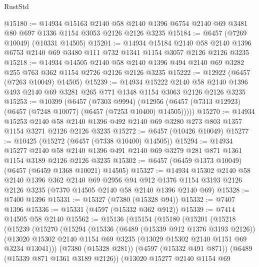 \begin{lexlean}{RustStd}
\begin{coremodule}
@15180 := @14934
    @15163
    @2140
    @58
    @2140
    @1396
    @6754
    @2140
    @69
    @3481
    @80
    @697
    @1336
    @1154
    @3053
    @2126
    @2126
    @3235
@15184 := @6457 (@7269 @10049) (@10331 @14505)
@15201 := @14934
    @15184
    @2140
    @58
    @2140
    @1396
    @6753
    @2140
    @69
    @3480
    @111
    @732
    @1341
    @1154
    @3057
    @2126
    @2126
    @3235
@15218 := @14934
    @14505
    @2140
    @58
    @2140
    @1396
    @494
    @2140
    @69
    @3282
    @255
    @763
    @362
    @1154
    @2726
    @2126
    @2126
    @3235
@15222 := @12922 (@6457 (@7263 @10049) @14505)
@15239 := @14934
    @15222
    @2140
    @58
    @2140
    @1396
    @493
    @2140
    @69
    @3281
    @265
    @771
    @1348
    @1154
    @3063
    @2126
    @2126
    @3235
@15253 := @10399
    (@6457
      (@7303 @9994)
      (@12956 (@6457 (@7313 @12923) (@6457 (@7248 @10077) (@6457 (@7253 @10400) @14505)))))
@15270 := @14934
    @15253
    @2140
    @58
    @2140
    @1396
    @492
    @2140
    @69
    @3280
    @273
    @803
    @1357
    @1154
    @3271
    @2126
    @2126
    @3235
@15272 := @6457 (@10426 @10049)
@15277 := @10425 (@15272 (@6457 (@7338 @10400) @14505))
@15294 := @14934
    @15277
    @2140
    @58
    @2140
    @1396
    @491
    @2140
    @69
    @3279
    @281
    @871
    @1361
    @1154
    @3189
    @2126
    @2126
    @3235
@15302 := @6457 (@6459 @1373 @10049) (@6457 (@6459 @1368 @10021) @14505)
@15327 := @14934
    @15302
    @2140
    @58
    @2140
    @1396
    @362
    @2140
    @69
    @2956
    @94
    @912
    @1376
    @1154
    @3193
    @2126
    @2126
    @3235
    (@7370 @14505 @2140 @58 @2140 @1396 @2140 @69)
@15328 := @7400 @1396
@15331 := @15327 (@7380 (@15328 @94))
@15332 := @7407 @1396
@15336 := @15331 (@4597 (@15332 @362 @912))
@15339 := @7414 @14505 @58 @2140
@15562 := @15136
    (@15154
      (@15180
        (@15201
          (@15218
            (@15239
              (@15270
                (@15294
                  (@15336
                    (@6489 (@15339 @912 @1376 @3193 @2126))
                    (@13020
                      @15302
                      @2140
                      @1154
                      @69
                      @3235
                      (@13029 @15302 @2140 @1151 @69 @3234 @13041)))
                  (@7380 (@15328 @281))
                  (@4597 (@15332 @491 @871))
                  (@6489 (@15339 @871 @1361 @3189 @2126))
                  (@13020
                    @15277
                    @2140
                    @1154
                    @69

\end{coremodule}
\end{lexlean}
